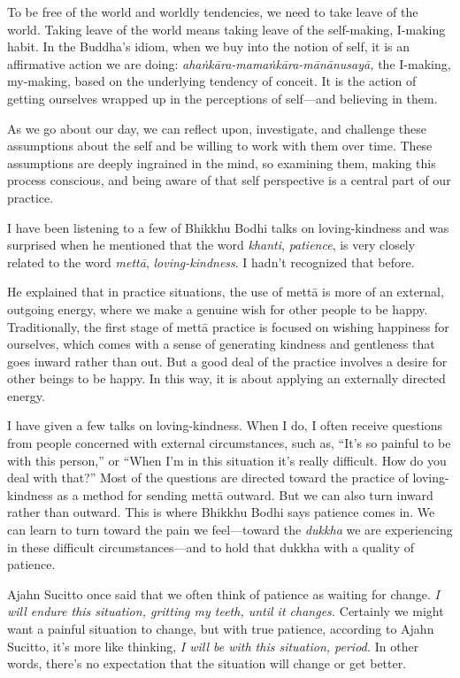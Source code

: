 To be free of the world and worldly tendencies, we need to take leave 
of the world. Taking leave of the world means taking leave of the 
self-making, I-making habit. In the Buddha's idiom, when we buy into 
the notion of self, it is an affirmative action we are doing: 
\emph{ahaṅkāra-mamaṅkāra-mānānusayā,} the I-making, my-making, 
based on the underlying tendency of conceit. It is the action of 
getting ourselves wrapped up in the perceptions of self---and believing 
in them.

As we go about our day, we can reflect upon, investigate, and challenge 
these assumptions about the self and be willing to work with them over 
time. These assumptions are deeply ingrained in the mind, so examining 
them, making this process conscious, and being aware of that self 
perspective is a central part of our practice.


I have been listening to a few of Bhikkhu Bodhi talks on 
loving-kindness and was surprised when he mentioned that the word 
\emph{khanti}, \emph{patience}, is very closely related to the word 
\emph{mettā}, \emph{loving-kindness}. I hadn't recognized that before.

He explained that in practice situations, the use of mettā is more of 
an external, outgoing energy, where we make a genuine wish for other 
people to be happy. Traditionally, the first stage of mettā practice 
is focused on wishing happiness for ourselves, which comes with a sense 
of generating kindness and gentleness that goes inward rather than out. 
But a good deal of the practice involves a desire for other beings to 
be happy. In this way, it is about applying an externally directed 
energy.

I have given a few talks on loving-kindness. When I do, I often receive 
questions from people concerned with external circumstances, such as, 
``It's so painful to be with this person,'' or ``When I'm in this 
situation it's really difficult. How do you deal with that?'' Most of 
the questions are directed toward the practice of loving-kindness as a 
method for sending mettā outward. But we can also turn inward rather 
than outward. This is where Bhikkhu Bodhi says patience comes in. We 
can learn to turn toward the pain we feel---toward the \emph{dukkha} we 
are experiencing in these difficult circumstances---and to hold that 
dukkha with a quality of patience.

Ajahn Sucitto once said that we often think of patience as waiting for 
change. \emph{I will endure this situation, gritting my teeth, until it 
changes.} Certainly we might want a painful situation to change, but 
with true patience, according to Ajahn Sucitto, it's more like 
thinking, \emph{I will be with this situation, period.} In other words, 
there's no expectation that the situation will change or get better.

